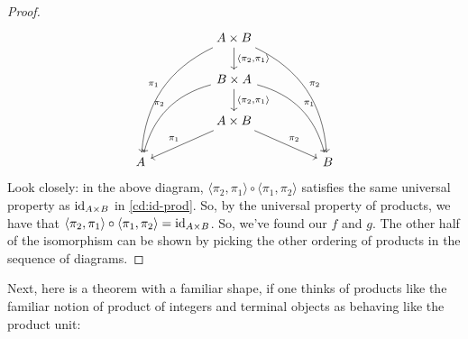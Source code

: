 \begin{proof}
\begin{equation}
\begin{tikzcd}[column sep = huge]
  & A \times B \arrow[d, "{\langle \pi_2, \pi_1 \rangle}"] \arrow[lddd, "\pi_1"', bend right] \arrow[rddd, "\pi_2", bend left] &   \\
  & B \times A \arrow[d, "{\langle \pi_2, \pi_1 \rangle}"] \arrow[ldd, "\pi_2"', bend right] \arrow[rdd, "\pi_1", bend left]   &   \\
  & A \times B \arrow[ld, "\pi_1"'] \arrow[rd, "\pi_2"]                                                                        &   \\
A &                                                                                                                            & B
\end{tikzcd}
\label{cd:comp-proj}
\end{equation}
Look closely: in the above diagram, $\langle \pi_2, \pi_1 \rangle \circ \langle \pi_1, \pi_2 \rangle$ 
satisfies the same universal property as $\operatorname{id}_{A \times B}$ in \cref{cd:id-prod}.
So, by the universal property of products, we have that $\langle \pi_2, \pi_1 \rangle \circ \langle \pi_1, \pi_2 \rangle = \operatorname{id}_{A \times B}$.
So, we've found our $f$ and $g$. The other half of the isomorphism can be shown by picking 
the other ordering of products in the sequence of diagrams.
\end{proof}

Next, here is a theorem with a familiar shape, if one thinks of
products like the familiar notion of product of integers and terminal
objects as behaving like the product unit:

